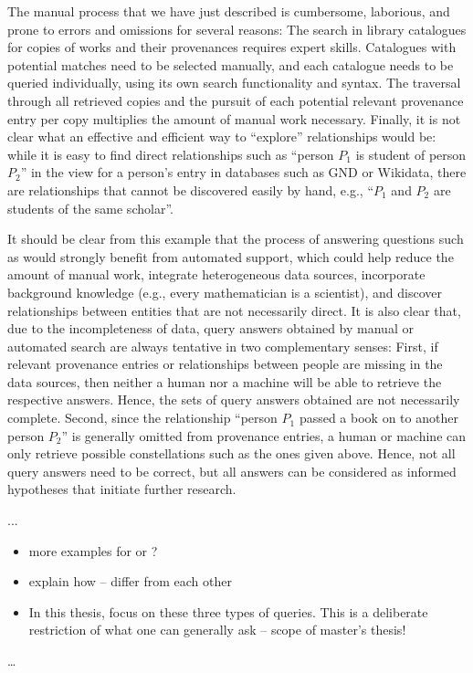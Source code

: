 The manual process that we have just described is cumbersome, laborious, and prone to errors and omissions for several reasons:
The search in library catalogues for copies of works and their provenances requires expert skills.
Catalogues with potential matches need to be selected manually,
and each catalogue needs to be queried individually, using its own search functionality and syntax. 
The traversal through all retrieved copies and the pursuit of each potential relevant provenance entry per copy 
multiplies the amount of manual work necessary.
Finally, it is not clear what an effective and efficient way to ``explore'' relationships would be:
while it is easy to find direct relationships such as ``person $P_1$ is student of person $P_2$'' in the view for a person's entry
in databases such as GND or Wikidata, there are relationships that cannot be discovered easily by hand,
e.g., ``$P_1$ and $P_2$ are students of the same scholar''.

It should be clear from this example that the process of answering questions such as 
would strongly benefit from automated support, which could help reduce the amount of manual work, integrate heterogeneous data sources,
incorporate background knowledge (e.g., every mathematician is a scientist),
and discover relationships between entities that are not necessarily direct.
It is also clear that, due to the incompleteness of data, query answers obtained by manual or automated search
are always tentative in two complementary senses: First, if relevant provenance entries or relationships between people are missing
in the data sources, then neither a human nor a machine will be able to retrieve the respective answers. Hence, the sets of query answers obtained
are not necessarily complete.
Second, since the relationship ``person $P_1$ passed a book on to another person $P_2$'' is generally omitted from
provenance entries, a human or machine can only retrieve possible constellations such as the ones
given above. Hence, not all query answers need to be correct, but all answers can be considered
as informed hypotheses that initiate further research.


...
%
\begin{itemize}
  \item
    more examples for  or ?
  \item
    explain how -- differ from each other
  \item
    In this thesis, focus on these three types of queries.
    This is a deliberate restriction of what one can generally ask – scope of master's thesis!
\end{itemize}



\dots

